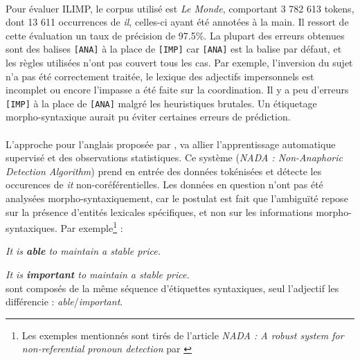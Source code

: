 \documentclass[a4paper,12pt]{article}
\begin{document}
\paragraph*{}
Pour évaluer ILIMP, le corpus utilisé est \emph{Le Monde}, comportant 3 782 613 tokens, dont 13 611 occurrences de \og{}\textit{il}\fg{}, celles-ci ayant été annotées à la main. Il ressort de cette évaluation un taux de précision de 97.5\%. La plupart des erreurs obtenues sont des balises \verb![ANA]! à la place de \verb![IMP]! car \verb![ANA]! est la balise par défaut, et les règles utilisées n'ont pas couvert tous les cas. Par exemple, l'inversion du sujet n'a pas été correctement traitée, le lexique des adjectifs impersonnels est incomplet ou encore l'impasse a été faite sur la coordination.
Il y a peu d'erreurs \verb![IMP]! à la place de \verb![ANA]! malgré les heuristiques brutales.
Un étiquetage morpho-syntaxique aurait pu éviter certaines erreurs de prédiction.

\paragraph{}
L'approche pour l'anglais proposée par \citet{Bergsma-11}, va allier l'apprentissage automatique supervisé et des observations statistiques.
Ce système (\textit{NADA : Non-Anaphoric Detection Algorithm}) prend en entrée des données tokénisées et détecte les occurences de \og{}\textit{it}\fg{} non-coréférentielles. Les données en question n'ont pas été analysées morpho-syntaxiquement, car le postulat est fait que l'ambiguïté repose sur la présence d'entités lexicales spécifiques, et non sur les informations morpho-syntaxiques.
Par exemple\footnote{Les exemples mentionnés sont tirés de l'article \textit{NADA : A robust system for non-referential pronoun detection} par \citet{Bergsma-11}} :

\og{} \textit{It is \textbf{able} to maintain a stable price.} \fg{}

\og{} \textit{It is \textbf{important} to maintain a stable price.} \fg{}
\\
sont composés de la même séquence d'étiquettes syntaxiques, seul l'adjectif les différencie : \textit{able}/\textit{important}.
\end{document}
